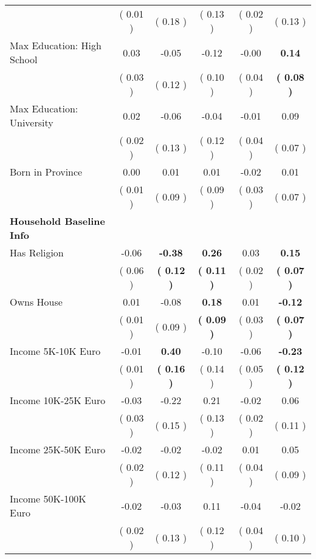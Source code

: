 \begin{table}[H]
{\begin{tabular}{lccccc}
\quad  & (     0.01 ) & (     0.18 )  & (     0.13 )  & (     0.02 ) & (     0.13 ) \\
\quad Max Education: High School &      0.03 &     -0.05 &     -0.12 &     -0.00 & \textbf{     0.14} \\
\quad  & (     0.03 ) & (     0.12 )  & (     0.10 )  & (     0.04 ) & \textbf{(     0.08 )} \\
\quad Max Education: University &      0.02 &     -0.06 &     -0.04 &     -0.01 &      0.09 \\
\quad  & (     0.02 ) & (     0.13 )  & (     0.12 )  & (     0.04 ) & (     0.07 ) \\
\quad Born in Province &      0.00 &      0.01 &      0.01 &     -0.02 &      0.01 \\
\quad  & (     0.01 ) & (     0.09 )  & (     0.09 )  & (     0.03 ) & (     0.07 ) \\
\midrule
\textbf{Household Baseline Info} \\
\quad Has Religion &     -0.06 & \textbf{    -0.38} & \textbf{     0.26} &      0.03 & \textbf{     0.15} \\
\quad  & (     0.06 ) & \textbf{(     0.12 )}  & \textbf{(     0.11 )}  & (     0.02 ) & \textbf{(     0.07 )} \\
\quad Owns House &      0.01 &     -0.08 & \textbf{     0.18} &      0.01 & \textbf{    -0.12} \\
\quad  & (     0.01 ) & (     0.09 )  & \textbf{(     0.09 )}  & (     0.03 ) & \textbf{(     0.07 )} \\
\quad Income 5K-10K Euro &     -0.01 & \textbf{     0.40} &     -0.10 &     -0.06 & \textbf{    -0.23} \\
\quad  & (     0.01 ) & \textbf{(     0.16 )}  & (     0.14 )  & (     0.05 ) & \textbf{(     0.12 )} \\
\quad Income 10K-25K Euro &     -0.03 &     -0.22 &      0.21 &     -0.02 &      0.06 \\
\quad  & (     0.03 ) & (     0.15 )  & (     0.13 )  & (     0.02 ) & (     0.11 ) \\
\quad Income 25K-50K Euro &     -0.02 &     -0.02 &     -0.02 &      0.01 &      0.05 \\
\quad  & (     0.02 ) & (     0.12 )  & (     0.11 )  & (     0.04 ) & (     0.09 ) \\
\quad Income 50K-100K Euro &     -0.02 &     -0.03 &      0.11 &     -0.04 &     -0.02 \\
\quad  & (     0.02 ) & (     0.13 )  & (     0.12 )  & (     0.04 ) & (     0.10 ) \\

\end{tabular}}
\end{table}
